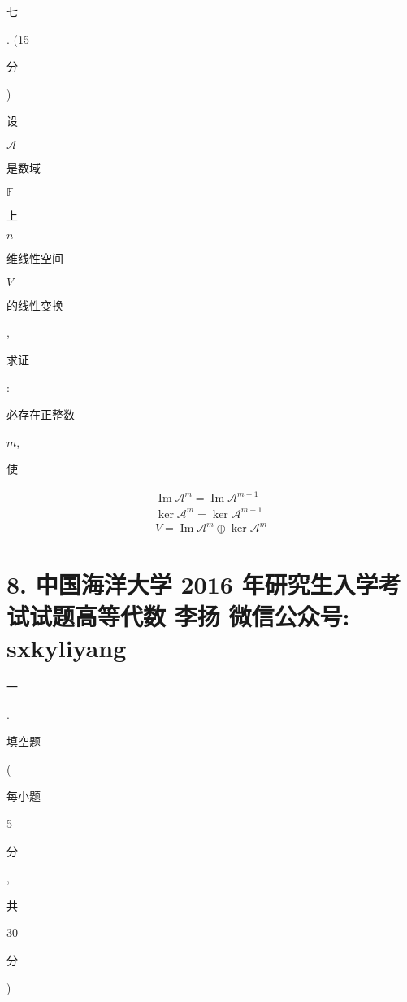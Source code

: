 \documentclass[10pt]{article}
\begin{document}
\begin{CJK}{UTF8}{mj}七\end{CJK}. (15 \begin{CJK}{UTF8}{mj}分\end{CJK}) \begin{CJK}{UTF8}{mj}设\end{CJK} $\mathscr{A}$ \begin{CJK}{UTF8}{mj}是数域\end{CJK} $\mathbb{F}$ \begin{CJK}{UTF8}{mj}上\end{CJK} $n$ \begin{CJK}{UTF8}{mj}维线性空间\end{CJK} $V$ \begin{CJK}{UTF8}{mj}的线性变换\end{CJK}, \begin{CJK}{UTF8}{mj}求证\end{CJK}: \begin{CJK}{UTF8}{mj}必存在正整数\end{CJK} $m$, \begin{CJK}{UTF8}{mj}使\end{CJK}
$$
\begin{gathered}
\operatorname{Im} \mathscr{A}^{m}=\operatorname{Im} \mathscr{A}^{m+1} \\
\operatorname{ker} \mathscr{A}^{m}=\operatorname{ker} \mathscr{A}^{m+1} \\
V=\operatorname{Im} \mathscr{A}^{m} \oplus \operatorname{ker} \mathscr{A}^{m}
\end{gathered}
$$

\section{8. 中国海洋大学 2016 年研究生入学考试试题高等代数 
 李扬 
 微信公众号: sxkyliyang}
\begin{CJK}{UTF8}{mj}一\end{CJK}. \begin{CJK}{UTF8}{mj}填空题\end{CJK} (\begin{CJK}{UTF8}{mj}每小题\end{CJK} 5 \begin{CJK}{UTF8}{mj}分\end{CJK}, \begin{CJK}{UTF8}{mj}共\end{CJK} 30 \begin{CJK}{UTF8}{mj}分\end{CJK})
\end{document}
